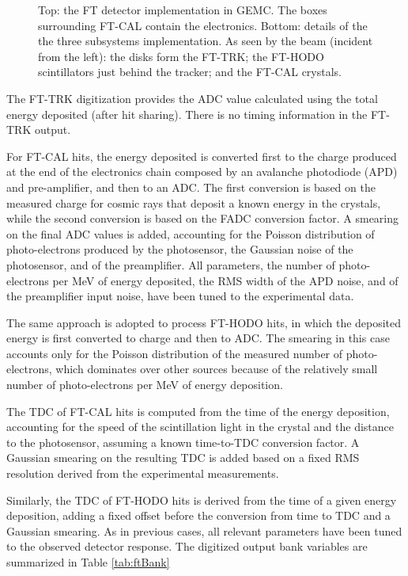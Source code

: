 \begin{figure}
	\caption{Top: the FT detector implementation in GEMC. The boxes surrounding FT-CAL contain the electronics.
			 Bottom: details of the the three subsystems implementation. As seen by the beam (incident from the left):
             the disks form the FT-TRK; the FT-HODO scintillators just behind the tracker;
			 and the FT-CAL crystals. }
	\label{fig:ftGeometry}
\end{figure}

The FT-TRK digitization provides the ADC value calculated using the total energy deposited (after hit sharing).
There is no timing information in the FT-TRK output.

For FT-CAL hits, the energy deposited is converted first to the charge produced at the end of the electronics chain composed
by an avalanche photodiode (APD) and pre-amplifier, and then to an ADC.
The first conversion is based on the measured charge for cosmic rays that deposit a known energy in the crystals,
while the second conversion is based on the FADC conversion factor. A smearing on the final ADC values is added,
accounting for the Poisson distribution of photo-electrons produced by the photosensor, the Gaussian noise of the
photosensor, and of the preamplifier. All parameters, the number of photo-electrons per MeV of energy deposited,
the RMS width of the APD noise, and of the preamplifier input noise, have been tuned to the experimental data.

The same approach is adopted to process FT-HODO hits, in which the deposited energy is first converted to charge and then to ADC.
The smearing in this case accounts only for the Poisson distribution of the measured number of photo-electrons,
which dominates over other sources because of the relatively small number of photo-electrons per MeV of energy deposition.

The TDC of FT-CAL hits is computed from the time of the energy deposition, accounting for the speed of the scintillation light in
the crystal and the distance to the photosensor, assuming a known time-to-TDC conversion factor. A Gaussian smearing on the
resulting TDC is added based on a fixed RMS resolution derived from the experimental measurements.

Similarly, the TDC of FT-HODO hits is derived from the time of a given energy deposition, adding a fixed offset before the
conversion from time to TDC and a Gaussian smearing. As in previous cases, all relevant parameters have been tuned to the
observed detector response.
The digitized output bank variables are summarized in Table \ref{tab:ftBank}


